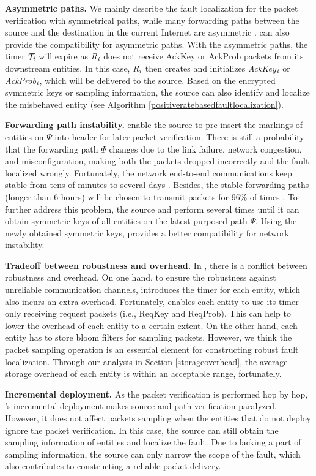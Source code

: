 \noindent\textbf{Asymmetric paths.} We mainly describe the fault localization for the packet verification with symmetrical paths, while many forwarding paths between the source and the destination in the current Internet are asymmetric \cite{john2010estimating} \cite{de2015asymmetric} \cite{wassermann2016analysis}. \name{} can also provide the compatibility for asymmetric paths. With the asymmetric paths, the timer $\mathcal{T}_\emph{i}$ will expire as \emph{R}$_\emph{i}$ does not receive AckKey or AckProb packets from its downstream entities. In this case, \emph{R}$_\emph{i}$ then creates and initializes \emph{AckKey}$_\emph{i}$ or \emph{AckProb}$_\emph{i}$, which will be delivered to the source. Based on the encrypted symmetric keys or sampling information, the source can also identify and localize the misbehaved entity (see Algorithm \ref{positiveratebasedfaultlocalization}).

\noindent\textbf{Forwarding path instability.} \name{} enable the source to pre-insert the markings of entities on $\Psi$ into \name{} header for later packet verification. There is still a probability that the forwarding path $\Psi$ changes due to the link failure, network congestion, and misconfiguration, making both the packets dropped incorrectly and the fault localized wrongly. Fortunately, the network end-to-end communications keep stable from tens of minutes to several days \cite{cunha2011measuring} \cite{kang2013crossfire}. Besides, the stable forwarding paths (longer than 6 hours) will be chosen to transmit packets for 96\% of times \cite{cunha2011measuring}. To further address this problem, the source and perform \namekey{} several times until it can obtain symmetric keys of all entities on the latest purposed path $\Psi$. Using the newly obtained symmetric keys, \name{} provides a better compatibility for network instability.

\noindent\textbf{Tradeoff between robustness and overhead.} In \name{}, there is a conflict between robustness and overhead. On one hand, to ensure the robustness against unreliable communication channels, \name{} introduces the timer for each entity, which also incurs an extra overhead. Fortunately, \name{} enables each entity to use its timer only receiving request packets (i.e., ReqKey and ReqProb). This can help to lower the overhead of each entity to a certain extent. On the other hand, each entity has to store bloom filters for sampling packets. However, we think the packet sampling operation is an essential element for constructing robust fault localization. Through our analysis in Section \ref{storageoverhead}, the average storage overhead of each entity is within an acceptable range, fortunately.

\noindent\textbf{Incremental deployment.} As the packet verification is performed hop by hop, \name{}'s incremental deployment makes source and path verification paralyzed. However, it does not affect packets sampling when the entities that do not deploy \name{} ignore the packet verification. In this case, the source can still obtain the sampling information of entities and localize the fault. Due to lacking a part of sampling information, the source can only narrow the scope of the fault, which also contributes to constructing a reliable packet delivery.